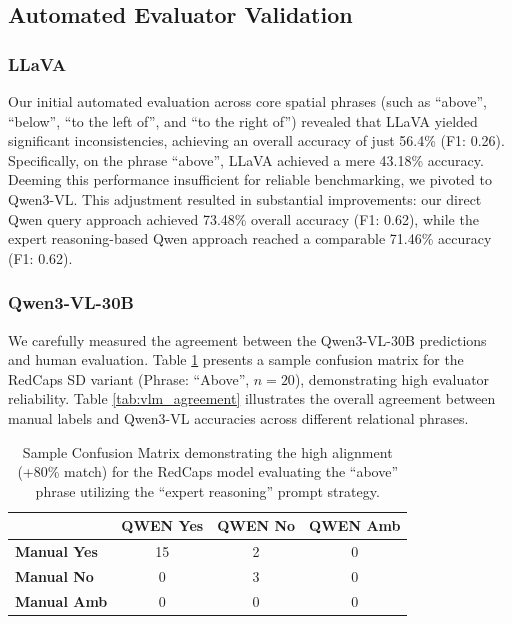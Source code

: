 \subsection{Automated Evaluator Validation}
\subsubsection{LLaVA}
Our initial automated evaluation across core spatial phrases (such as ``above'', ``below'', ``to the left of'', and ``to the right of'') revealed that LLaVA yielded significant inconsistencies, achieving an overall accuracy of just 56.4\% (F1: 0.26). Specifically, on the phrase ``above'', LLaVA achieved a mere 43.18\% accuracy. Deeming this performance insufficient for reliable benchmarking, we pivoted to Qwen3-VL. This adjustment resulted in substantial improvements: our direct Qwen query approach achieved 73.48\% overall accuracy (F1: 0.62), while the expert reasoning-based Qwen approach reached a comparable 71.46\% accuracy (F1: 0.62).

\subsubsection{Qwen3-VL-30B}
We carefully measured the agreement between the Qwen3-VL-30B predictions and human evaluation. Table \ref{tab:redcaps_cm} presents a sample confusion matrix for the RedCaps SD variant (Phrase: ``Above'', $n=20$), demonstrating high evaluator reliability. Table \ref{tab:vlm_agreement} illustrates the overall agreement between manual labels and Qwen3-VL accuracies across different relational phrases.

\begin{table}[ht]
\caption{Sample Confusion Matrix demonstrating the high alignment (+80\% match) for the RedCaps model evaluating the ``above'' phrase utilizing the ``expert reasoning'' prompt strategy.}
\label{tab:redcaps_cm}
\begin{center}
\begin{small}
\begin{tabular}{lccc}
\toprule
 & \textbf{QWEN Yes} & \textbf{QWEN No} & \textbf{QWEN Amb} \\
\midrule
\textbf{Manual Yes} & 15 & 2 & 0 \\
\textbf{Manual No} & 0 & 3 & 0 \\
\textbf{Manual Amb} & 0 & 0 & 0 \\
\bottomrule
\end{tabular}
\end{small}
\end{center}
\end{table}

